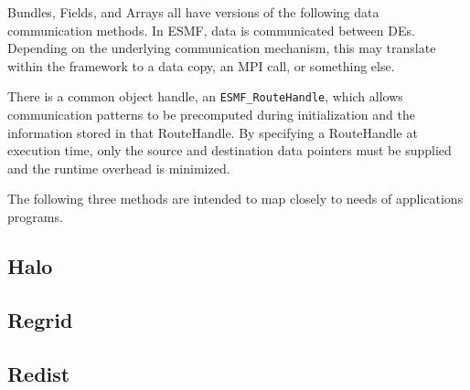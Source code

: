 Bundles, Fields, and Arrays all have versions of the following
data communication methods.  In ESMF, data is communicated 
between DEs.  Depending on the underlying communication 
mechanism, this may translate within the framework to a data 
copy, an MPI call, or something else.

There is a common object handle, an {\tt ESMF\_RouteHandle}, which
allows communication patterns to be precomputed during 
initialization and the information stored in that RouteHandle.
By specifying a RouteHandle at execution time, only
the source and destination data pointers must be supplied and the
runtime overhead is minimized.

The following three methods are intended to map closely to 
needs of applications programs.

\subsection{Halo}


\subsection{Regrid}



\subsection{Redist}


